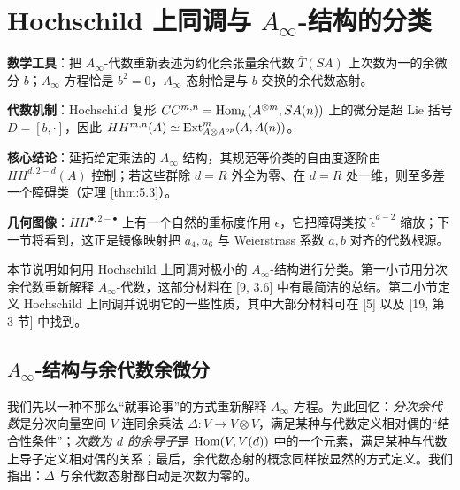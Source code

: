 
\section{\texorpdfstring{Hochschild 上同调与 $A_\infty$-结构的分类}{Hochschild 上同调与 A∞-结构的分类}}\label{sec:hoch}

\begin{keytakeaways}
  \item \textbf{数学工具}：把 $A_\infty$-代数重新表述为约化余张量余代数 $\bar T(SA)$ 上次数为一的余微分 $b$；$A_\infty$-方程恰是 $b^2=0$，$A_\infty$-态射恰是与 $b$ 交换的余代数态射。
  \item \textbf{代数机制}：Hochschild 复形 $CC^{m,n}=\operatorname{Hom}_k(A^{\otimes m},SA(n))$ 上的微分是超 Lie 括号 $D=[b,\cdot]$，因此 $HH^{m,n}(A)\simeq\operatorname{Ext}^m_{A\otimes A^{op}}(A,A(n))$。
  \item \textbf{核心结论}：延拓给定乘法的 $A_\infty$-结构，其规范等价类的自由度逐阶由 $HH^{d,2-d}(A)$ 控制；若这些群除 $d=R$ 外全为零、在 $d=R$ 处一维，则至多差一个障碍类（定理 \ref{thm:5.3}）。
  \item \textbf{几何图像}：$HH^{\bullet,2-\bullet}$ 上有一个自然的重标度作用 $\epsilon$，它把障碍类按 $\tilde\epsilon^{d-2}$ 缩放；下一节将看到，这正是镜像映射把 $a_4,a_6$ 与 Weierstrass 系数 $a,b$ 对齐的代数根源。
\end{keytakeaways}

本节说明如何用 Hochschild 上同调对极小的 $A_\infty$-结构进行分类。第一小节用分次余代数重新解释 $A_\infty$-代数，这部分材料在 [9, 3.6] 中有最简洁的总结。第二小节定义 Hochschild 上同调并说明它的一些性质，其中大部分材料可在 [5] 以及 [19, 第 3 节] 中找到。

\subsection{\texorpdfstring{$A_\infty$-结构与余代数余微分}{A∞-结构与余代数余微分}}\label{subsec:coalgebra}

我们先以一种不那么“就事论事”的方式重新解释 $A_\infty$-方程。为此回忆：\emph{分次余代数}是分次向量空间 $V$ 连同余乘法 $\Delta:V\to V\otimes V$，满足某种与代数定义相对偶的“结合性条件”；\emph{次数为 $d$ 的余导子}是 $\operatorname{Hom}(V,V(d))$ 中的一个元素，满足某种与代数上导子定义相对偶的关系；最后，余代数态射的概念同样按显然的方式定义。我们指出：$\Delta$ 与余代数态射都自动是次数为零的。

